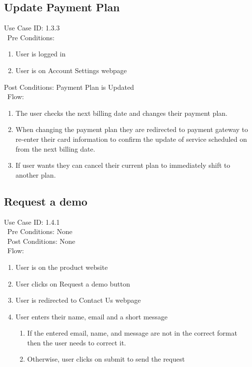 \subsection{Update Payment Plan} 
Use Case ID: 1.3.3\\\
Pre Conditions: 
\begin{enumerate}
    \item User is logged in
    \item User is on Account Settings webpage
\end{enumerate}
Post Conditions: Payment Plan is Updated\\\
Flow: 
\begin{enumerate}
    \item The user checks the next billing date and changes their payment plan.
    \item When changing the payment plan they are redirected to payment gateway to re-enter their card information to confirm the update of service scheduled on from the next billing date.
    \item If user wants they can cancel their current plan to immediately shift to another plan. 
\end{enumerate}
\subsection{Request a demo} 
Use Case ID: 1.4.1\\\
Pre Conditions: None\\\
Post Conditions: None\\\
Flow: 
\begin{enumerate}
    \item User is on the product website
    \item User clicks on Request a demo button
    \item User is redirected to Contact Us webpage
    \item User enters their name, email and a short message
    \begin{enumerate}
        \item If the entered email, name, and message are not in the correct format then the user needs to correct it.
        \item Otherwise, user clicks on submit to send the request
    \end{enumerate}
\end{enumerate}
